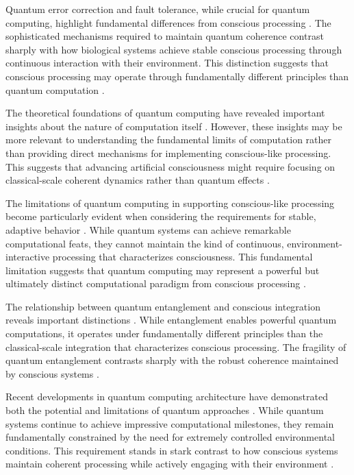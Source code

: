 Quantum error correction and fault tolerance, while crucial for quantum computing, highlight fundamental differences from conscious processing \cite{Harrow2020}. The sophisticated mechanisms required to maintain quantum coherence contrast sharply with how biological systems achieve stable conscious processing through continuous interaction with their environment. This distinction suggests that conscious processing may operate through fundamentally different principles than quantum computation \cite{Kitaev2018}.

The theoretical foundations of quantum computing have revealed important insights about the nature of computation itself \cite{Montanaro2021}. However, these insights may be more relevant to understanding the fundamental limits of computation rather than providing direct mechanisms for implementing conscious-like processing. This suggests that advancing artificial consciousness might require focusing on classical-scale coherent dynamics rather than quantum effects \cite{Nielsen2020}.

The limitations of quantum computing in supporting conscious-like processing become particularly evident when considering the requirements for stable, adaptive behavior \cite{Preskill2019}. While quantum systems can achieve remarkable computational feats, they cannot maintain the kind of continuous, environment-interactive processing that characterizes consciousness. This fundamental limitation suggests that quantum computing may represent a powerful but ultimately distinct computational paradigm from conscious processing \cite{Shor2019}.

The relationship between quantum entanglement and conscious integration reveals important distinctions \cite{Svore2020}. While entanglement enables powerful quantum computations, it operates under fundamentally different principles than the classical-scale integration that characterizes conscious processing. The fragility of quantum entanglement contrasts sharply with the robust coherence maintained by conscious systems \cite{Terhal2018}.

Recent developments in quantum computing architecture have demonstrated both the potential and limitations of quantum approaches \cite{Wallraff2021}. While quantum systems continue to achieve impressive computational milestones, they remain fundamentally constrained by the need for extremely controlled environmental conditions. This requirement stands in stark contrast to how conscious systems maintain coherent processing while actively engaging with their environment \cite{Zhong2020}.

